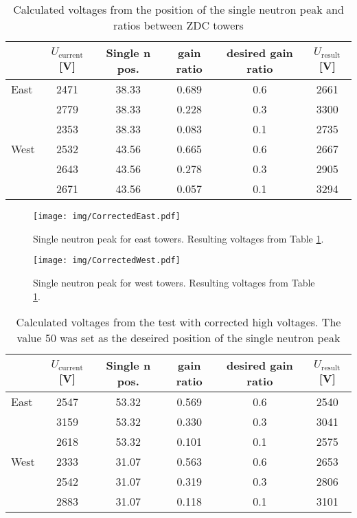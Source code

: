 \documentclass[a4paper,10pt]{report}
\begin{document}
\begin{table}[htb] 
\caption{Calculated voltages from the position of the single neutron peak and ratios 
between ZDC towers}
\label{uncorected}
\begin{center}
\begin{tabular}{lccccc}
 \toprule
 &$U_\text{current}$[V]&Single n pos.&gain ratio&desired gain ratio&$U_\text{result}$[V]\\
\midrule
 East&2471&38.33&0.689&0.6&2661\\
     &2779&38.33&0.228&0.3&3300\\
     &2353&38.33&0.083&0.1&2735\\
 \midrule
West&2532&43.56&0.665&0.6&2667\\
    &2643&43.56&0.278&0.3&2905\\
    &2671&43.56&0.057&0.1&3294\\
 \bottomrule
\end{tabular}
\end{center}
\end{table}

\begin{figure}[htb]
\begin{center}
\texttt{[image: img/CorrectedEast.pdf]}
\end{center}
\caption{Single neutron peak for east towers. Resulting voltages from Table \ref{uncorected}.}
\label{eastPlot}
\end{figure}

\begin{figure}[htb]
\begin{center}
\texttt{[image: img/CorrectedWest.pdf]}
\end{center}
\caption{Single neutron peak for west towers. Resulting voltages from Table \ref{uncorected}.}
\label{westPlot}
\end{figure}

\begin{table}[htb] 
\caption{Calculated voltages from the test with corrected high voltages.
The value 50 was set as the deseired position of the single neutron peak}
\label{corected}
\begin{center}
\begin{tabular}{lccccc}
 \toprule
 &$U_\text{current}$[V]&Single n pos.&gain ratio&desired gain ratio&$U_\text{result}$[V]\\
\midrule
 East&2547&53.32&0.569&0.6&2540\\
     &3159&53.32&0.330&0.3&3041\\
     &2618&53.32&0.101&0.1&2575\\
 \midrule
West&2333&31.07&0.563&0.6&2653\\
    &2542&31.07&0.319&0.3&2806\\
    &2883&31.07&0.118&0.1&3101\\
 \bottomrule
\end{tabular}
\end{center}
\end{table}
\end{document}
